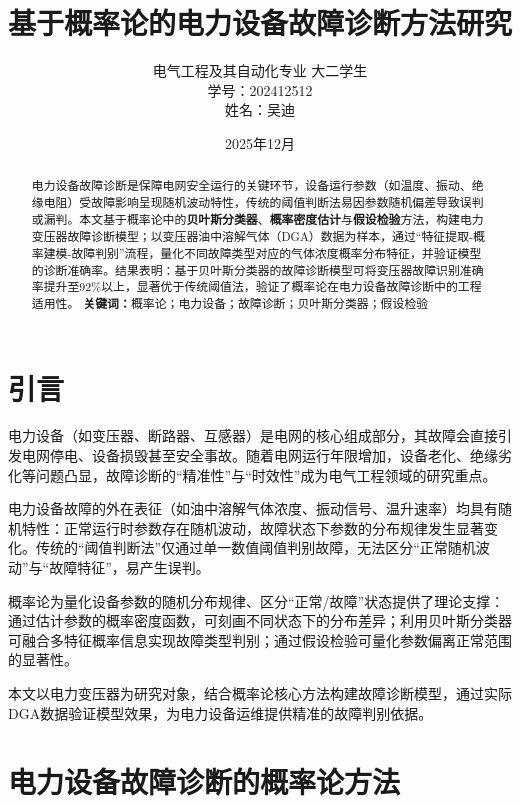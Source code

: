 \documentclass[12pt,a4paper]{article}
\begin{document}
\title{基于概率论的电力设备故障诊断方法研究}
\author{电气工程及其自动化专业 大二学生\\学号：202412512\\姓名：吴迪}
\date{2025年12月}
\maketitle

\begin{abstract}
电力设备故障诊断是保障电网安全运行的关键环节，设备运行参数（如温度、振动、绝缘电阻）受故障影响呈现随机波动特性，传统的阈值判断法易因参数随机偏差导致误判或漏判。本文基于概率论中的\textbf{贝叶斯分类器}、\textbf{概率密度估计}与\textbf{假设检验}方法，构建电力变压器故障诊断模型；以变压器油中溶解气体（DGA）数据为样本，通过“特征提取-概率建模-故障判别”流程，量化不同故障类型对应的气体浓度概率分布特征，并验证模型的诊断准确率。结果表明：基于贝叶斯分类器的故障诊断模型可将变压器故障识别准确率提升至92\%以上，显著优于传统阈值法，验证了概率论在电力设备故障诊断中的工程适用性。
\textbf{关键词：}概率论；电力设备；故障诊断；贝叶斯分类器；假设检验
\end{abstract}

\section{引言}
电力设备（如变压器、断路器、互感器）是电网的核心组成部分，其故障会直接引发电网停电、设备损毁甚至安全事故\cite{equipment_diagnosis}。随着电网运行年限增加，设备老化、绝缘劣化等问题凸显，故障诊断的“精准性”与“时效性”成为电气工程领域的研究重点。

电力设备故障的外在表征（如油中溶解气体浓度、振动信号、温升速率）均具有随机特性：正常运行时参数存在随机波动，故障状态下参数的分布规律发生显著变化。传统的“阈值判断法”仅通过单一数值阈值判别故障，无法区分“正常随机波动”与“故障特征”，易产生误判。

概率论为量化设备参数的随机分布规律、区分“正常/故障”状态提供了理论支撑：通过估计参数的概率密度函数，可刻画不同状态下的分布差异；利用贝叶斯分类器可融合多特征概率信息实现故障类型判别；通过假设检验可量化参数偏离正常范围的显著性。

本文以电力变压器为研究对象，结合概率论核心方法构建故障诊断模型，通过实际DGA数据验证模型效果，为电力设备运维提供精准的故障判别依据。

\section{电力设备故障诊断的概率论方法}
\end{document}
